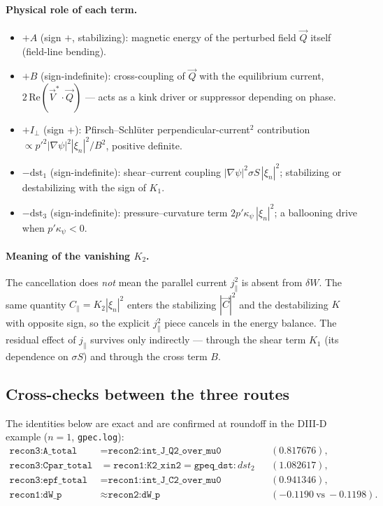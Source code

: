 \documentclass[10pt,a4paper]{article}
\numberwithin{equation}{section}
\begin{document}
\paragraph{Physical role of each term.}
\begin{itemize}
\item $+A$ (sign $+$, stabilizing): magnetic energy of the perturbed field
  $\vec Q$ itself (field-line bending).
\item $+B$ (sign-indefinite): cross-coupling of $\vec Q$ with the equilibrium
  current, $2\,\mathrm{Re}(\vec V^{*}\!\cdot\vec Q)$ --- acts as a kink
  driver or suppressor depending on phase.
\item $+I_\perp$ (sign $+$): Pfirsch--Schl\"uter perpendicular-current$^2$
  contribution $\propto p'^2|\nabla\psi|^2|\xi_n|^2/B^2$, positive definite.
\item $-\mathrm{dst}_1$ (sign-indefinite): shear--current coupling
  $|\nabla\psi|^2\sigma S\,|\xi_n|^2$; stabilizing or destabilizing with the
  sign of $K_1$.
\item $-\mathrm{dst}_3$ (sign-indefinite): pressure--curvature term
  $2p'\kappa_\psi\,|\xi_n|^2$; a ballooning drive when $p'\kappa_\psi<0$.
\end{itemize}

\paragraph{Meaning of the vanishing $K_2$.}
The cancellation does \emph{not} mean the parallel current $j_\parallel^2$ is
absent from $\delta W$.  The same quantity $C_\parallel=K_2|\xi_n|^2$ enters the
stabilizing $|\vec C|^2$ and the destabilizing $K$ with opposite sign, so the
explicit $j_\parallel^2$ piece cancels in the energy balance.  The residual
effect of $j_\parallel$ survives only indirectly --- through the shear term
$K_1$ (its dependence on $\sigma S$) and through the cross term $B$.

\subsection{Cross-checks between the three routes}

The identities below are exact and are confirmed at roundoff in the DIII-D
example ($n=1$, \texttt{gpec.log}):
\begin{align}
\texttt{recon3:A\_total} &= \texttt{recon2:int\_J\_Q2\_over\_mu0}
 &&(0.817676),\\
\texttt{recon3:Cpar\_total} &= \texttt{recon1:K2\_xin2}
 = \texttt{gpeq\_dst}:dst_2 &&(1.082617),\\
\texttt{recon3:epf\_total} &= \texttt{recon1:int\_J\_C2\_over\_mu0}
 &&(0.941346),\\
\texttt{recon1:dW\_p} &\approx \texttt{recon2:dW\_p}
 &&(-0.1190\ \text{vs}\ -0.1198).
\end{align}
\end{document}
